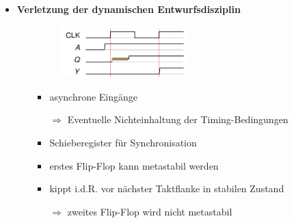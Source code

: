 \documentclass[11pt,a4paper]{article}
\begin{document}
\begin{itemize}
\item \textbf{Verletzung der dynamischen Entwurfsdisziplin}
	\begin{itemize}
	\item[]		
				\begin{minipage}{0.25\textwidth}
					\begin{figure}[H]
					\includegraphics[height=2cm]{verletzungdyn}
					\end{figure}
				\end{minipage}
				\begin{minipage}[t]{0.65\textwidth}
					\vspace{-1.5cm}
					\begin{itemize}
					\item asynchrone Eingänge 
					\item[$\Rightarrow$]Eventuelle Nichteinhaltung der Timing-Bedingungen
					\item Schieberegister für Synchronisation
					\item erstes Flip-Flop kann metastabil werden
					\item kippt i.d.R. vor nächster Taktflanke in stabilen Zustand
					\item[$\Rightarrow$] zweites Flip-Flop wird nicht metastabil
					\end{itemize}
				\end{minipage}
	

	\end{itemize}
	
\end{itemize}
\end{document}
